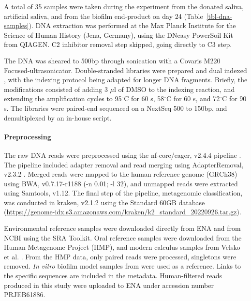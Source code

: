 \documentclass[10pt,a4paper]{article}
\begin{document}
A total of 35 samples were taken during the experiment from the donated
saliva, artificial saliva, and from the biofilm end-product on day 24
(Table~\ref{tbl-dna-samples}). DNA extraction was performed at the Max
Planck Institute for the Science of Human History (Jena, Germany), using
the DNeasy PowerSoil Kit from QIAGEN. C2 inhibitor removal step skipped,
going directly to C3 step.

The DNA was sheared to 500bp through sonication with a Covaris M220
Focused-ultrasonicator. Double-stranded libraries were prepared
\citep{aronHalfUDG2020} and dual indexed
\citep{stahlDoublestrandedIndexing2019}, with the indexing protocol
being adapted for longer DNA fragments. Briefly, the modifications
consisted of adding 3 \(\mu\)l of DMSO to the indexing reaction, and extending
the amplification cycles to 95\(^{\circ}\)C for 60 s, 58\(^{\circ}\)C
for 60 s, and 72\(^{\circ}\)C for 90 s. The libraries were paired-end
sequenced on a NextSeq 500 to 150bp, and demultiplexed by an in-house
script.

\paragraph{Preprocessing}\label{preprocessing}

The raw DNA reads were preprocessed using the nf-core/eager, v2.4.4
pipeline \citep{yatesEAGER2020}. The pipeline included adapter removal
and read merging using AdapterRemoval, v2.3.2 \citep{AdapterRemovalv2}.
Merged reads were mapped to the human reference genome (GRCh38) using
BWA, v0.7.17-r1188 \citep{BWA} (-n 0.01; -l 32), and unmapped reads were
extracted using Samtools, v1.12. The final step of the pipeline,
metagenomic classification, was conducted in kraken, v2.1.2
\citep{kraken2} using the Standard 60GB database
(\url{https://genome-idx.s3.amazonaws.com/kraken/k2_standard_20220926.tar.gz}).

Environmental reference samples were downloaded directly from ENA and
from NCBI using the SRA Toolkit. Oral reference samples were downloaded
from the Human Metagenome Project (HMP), and modern calculus samples
from Velsko et al. \citep{velskoDentalCalculus2017}. From the HMP
data, only paired reads were processed, singletons were removed.
\emph{In vitro} biofilm model samples from
\citep{edlundUncoveringComplex2018} were used as a reference. Links to
the specific sequences are included in the metadata. Human-filtered
reads produced in this study were uploaded to ENA under accession number
PRJEB61886.
\end{document}
